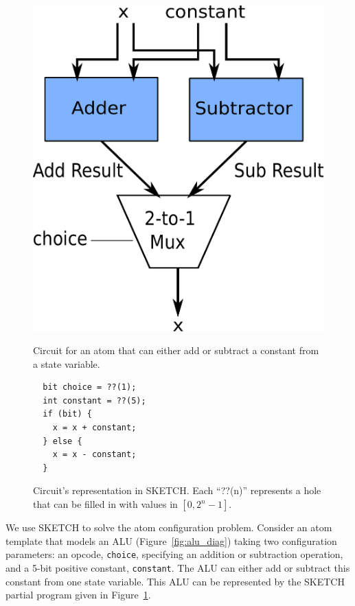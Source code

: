 \begin{figure}[h]
  \begin{minipage}{0.4\columnwidth}
  \begin{center}
  \includegraphics[width=\columnwidth]{circuit.pdf}
  \end{center}
  \caption{Circuit for an atom that can either add or subtract a constant from a state variable.}
  \label{fig:alu_diag}
  \end{minipage}
  \begin{minipage}{0.55\columnwidth}
  \begin{center}
  \begin{lstlisting}
  bit choice = ??(1);
  int constant = ??(5);
  if (bit) {
    x = x + constant;
  } else {
    x = x - constant;
  }
  \end{lstlisting}
  \end{center}
  \caption{Circuit's representation in SKETCH. Each ``??(n)'' represents a hole
  that can be filled in with values in $[0, 2^n -1]$.}
  \label{fig:alu_in_sketch}
  \end{minipage}
\end{figure}

We use SKETCH to solve the atom configuration problem.  Consider an atom
template that models an ALU (Figure~\ref{fig:alu_diag}) taking two
configuration parameters: an opcode, \texttt{choice}, specifying an addition or
subtraction operation, and a 5-bit positive constant, \texttt{constant}.  The
ALU can either add or subtract this constant from one state variable. This ALU
can be represented by the SKETCH partial program given in
Figure~\ref{fig:alu_in_sketch}.

